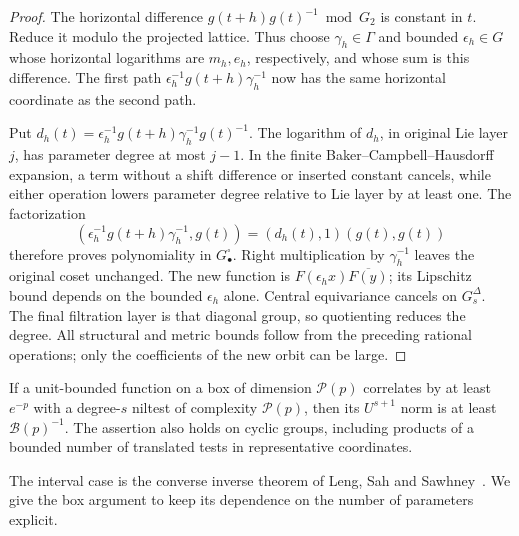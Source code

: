 \begin{proof}
The horizontal difference $g(t+h)g(t)^{-1}\bmod G_2$ is constant in
$t$.  Reduce it modulo the projected lattice.  Thus choose
$\gamma_h\in\Gamma$ and bounded $\epsilon_h\in G$ whose horizontal
logarithms are $m_h,e_h$, respectively, and whose sum is this
difference.  The first path
$\epsilon_h^{-1}g(t+h)\gamma_h^{-1}$ now has the same horizontal
coordinate as the second path.

Put $d_h(t)=\epsilon_h^{-1}g(t+h)\gamma_h^{-1}g(t)^{-1}$.
The logarithm of $d_h$, in original Lie layer $j$, has parameter
degree at most $j-1$.  In the finite
Baker--Campbell--Hausdorff expansion, a term without a shift
difference or inserted constant cancels, while either operation
lowers parameter degree relative to Lie layer by at least one.
The factorization
\[
 (\epsilon_h^{-1}g(t+h)\gamma_h^{-1},g(t))
     =(d_h(t),1)(g(t),g(t))
\]
therefore proves polynomiality in $G^\square_\bullet$.
Right multiplication by $\gamma_h^{-1}$ leaves the original coset
unchanged.  The new function is $F(\epsilon_hx)\overline{F(y)}$;
its Lipschitz bound depends on the bounded $\epsilon_h$ alone.
Central equivariance cancels on $G_s^\Delta$.  The final filtration
layer is that diagonal group, so quotienting reduces the degree.
All structural and metric bounds follow from the preceding rational
operations; only the coefficients of the new orbit can be large.
\end{proof}

\begin{lemma}
\label{prelim:dual-gowers}
If a unit-bounded function on a box of dimension $\mathcal P(p)$
correlates by at least $e^{-p}$ with a degree-$s$ niltest of complexity
$\mathcal P(p)$, then its $U^{s+1}$ norm is at least
$\mathcal B(p)^{-1}$.  The assertion also holds on cyclic groups,
including products of a bounded number of translated tests in
representative coordinates.
\end{lemma}

The interval case is the converse inverse theorem of Leng, Sah and
Sawhney~\cite[Lemma~B.5]{LSSInverse2024}.  We give the box argument
to keep its dependence on the number of parameters explicit.

